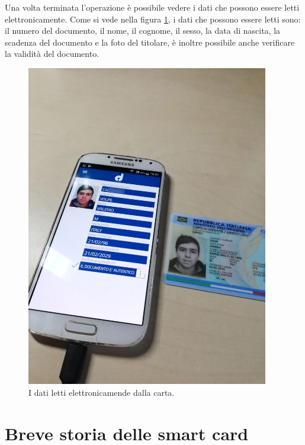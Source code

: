 Una volta terminata l'operazione è possibile vedere i dati che possono essere letti elettronicamente. Come si vede nella figura \ref{fig:carta_letta}, i dati che possono essere letti sono: il numero del documento, il nome, il cognome, il sesso, la data di nascita, la scadenza del documento e la foto del titolare, è inoltre possibile anche verificare la validità del documento.

\begin{figure}[h!]
  \centering
  \includegraphics[width=300pt]{pictures/carta_letta.jpg}
  \caption{I dati letti elettronicamende dalla carta.}
  \label{fig:carta_letta}
\end{figure}


\section{Breve storia delle smart card}

    

